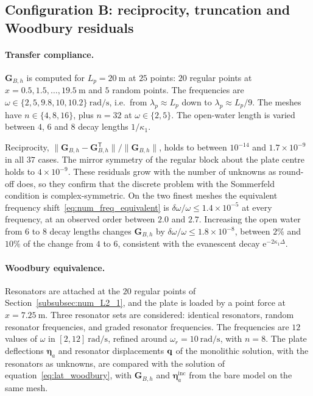 {\subsection{Configuration B: reciprocity, truncation and Woodbury residuals}\label{app:ver_configB}

\paragraph{Transfer compliance.} $\mathbf{G}_{B,h}$ is computed for $L_p=20~\si{\meter}$ at $25$ points: $20$ regular points at $x=0.5,1.5,\ldots,19.5~\si{\meter}$ and $5$ random points. The frequencies are $\omega\in\{2,5,9.8,10,10.2\}~\si{\radian\per\second}$, i.e.\ from $\lambda_p\approx L_p$ down to $\lambda_p\approx L_p/9$. The meshes have $n\in\{4,8,16\}$, plus $n=32$ at $\omega\in\{2,5\}$. The open-water length is varied between $4$, $6$ and $8$ decay lengths $1/\kappa_1$.

Reciprocity, $\|\mathbf{G}_{B,h}-\mathbf{G}_{B,h}^{\mathsf T}\|/\|\mathbf{G}_{B,h}\|$, holds to between $10^{-14}$ and $1.7\times10^{-9}$ in all $37$ cases. The mirror symmetry of the regular block about the plate centre holds to $4\times10^{-9}$. These residuals grow with the number of unknowns as round-off does, so they confirm that the discrete problem with the Sommerfeld condition is complex-symmetric. On the two finest meshes the equivalent frequency shift~\eqref{eq:num_freq_equivalent} is $\delta\omega/\omega\le1.4\times10^{-5}$ at every frequency, at an observed order between $2.0$ and $2.7$. Increasing the open water from $6$ to $8$ decay lengths changes $\mathbf{G}_{B,h}$ by $\delta\omega/\omega\le1.8\times10^{-8}$, between $2\%$ and $10\%$ of the change from $4$ to $6$, consistent with the evanescent decay $\mathrm{e}^{-2\kappa_1\Delta}$.

\paragraph{Woodbury equivalence.} Resonators are attached at the $20$ regular points of Section~\ref{subsubsec:num_L2_1}, and the plate is loaded by a point force at $x=7.25~\si{\meter}$. Three resonator sets are considered: identical resonators, random resonator frequencies, and graded resonator frequencies. The frequencies are $12$ values of $\omega$ in $[2,12]~\si{\radian\per\second}$, refined around $\omega_r=10~\si{\radian\per\second}$, with $n=8$. The plate deflections $\boldsymbol{\eta}_a$ and resonator displacements $\mathbf{q}$ of the monolithic solution, with the resonators as unknowns, are compared with the solution of equation~\eqref{eq:lat_woodbury}, with $\mathbf{G}_{B,h}$ and $\boldsymbol{\eta}_a^\mathrm{inc}$ from the bare model on the same mesh.

}
